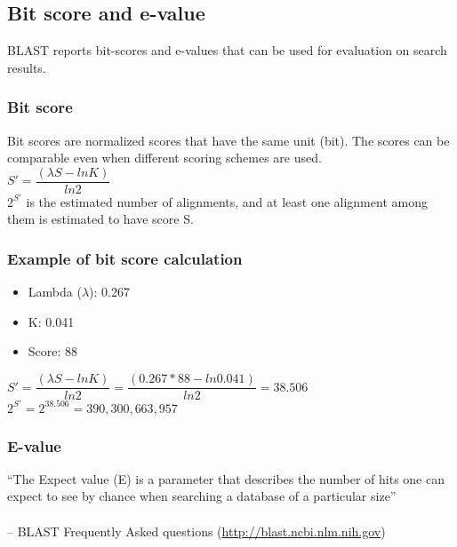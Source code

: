 %
%

%
%
\subsection{Bit score and e-value}
BLAST reports bit-scores and e-values that can be used for evaluation on search results.

%
%
\subsubsection*{Bit score} 
Bit scores are normalized scores that have the same unit (bit). The scores can be comparable even when different scoring schemes are used. \\

$S' = \dfrac{(\lambda S - ln⁡K)}{ln⁡2}$ \\

\noindent
$2^{S'}$ is the estimated number of alignments, and at least one alignment among them is estimated to have score S.

%
%
\subsubsection*{Example of bit score calculation} 
\begin{itemize}
\item Lambda ($\lambda$): 0.267
\item K: 0.041
\item Score: 88
\end{itemize}

$S' = \dfrac{(\lambda S - ln⁡K)}{ln⁡2} = \dfrac{(0.267 * 88 -  ln⁡0.041)}{ln⁡2} = 38.506$\\

$2^{S'} = 2^{38.506} = 390,300,663,957$

%
%
\subsubsection*{E-value} 
``The Expect value (E) is a parameter that describes the number of hits one can expect to see by chance when searching a database of a particular size'' \\ \\
-- BLAST Frequently Asked questions (\href{http://blast.ncbi.nlm.nih.gov}{http://blast.ncbi.nlm.nih.gov}) \\

